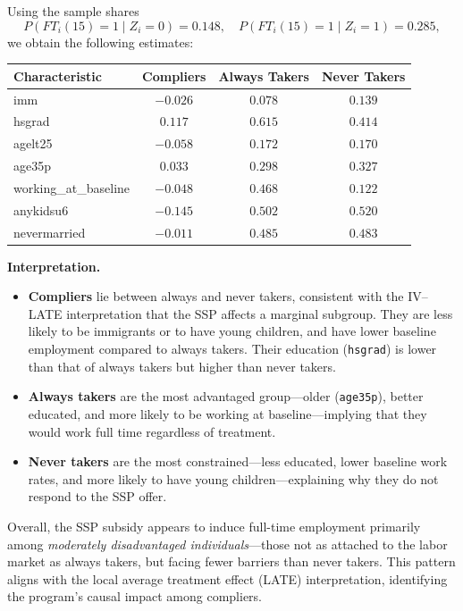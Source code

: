 \documentclass[12pt]{article}
\begin{document}
\begin{enumerate}[label=\arabic*.]
    Using the sample shares
    \[
    P(FT_i(15)=1\mid Z_i=0)=0.148, \quad 
    P(FT_i(15)=1\mid Z_i=1)=0.285,
    \]
    we obtain the following estimates:

    \begin{center}
    \begin{tabular}{@{}lccc@{}}
    \toprule
    Characteristic & Compliers & Always Takers & Never Takers \\
    \midrule
    imm & $-0.026$ & $0.078$ & $0.139$ \\
    hsgrad & $0.117$ & $0.615$ & $0.414$ \\
    agelt25 & $-0.058$ & $0.172$ & $0.170$ \\
    age35p & $0.033$ & $0.298$ & $0.327$ \\
    working\_at\_baseline & $-0.048$ & $0.468$ & $0.122$ \\
    anykidsu6 & $-0.145$ & $0.502$ & $0.520$ \\
    nevermarried & $-0.011$ & $0.485$ & $0.483$ \\
    \bottomrule
    \end{tabular}
    \end{center}

    \noindent\textbf{Interpretation.}
    \begin{itemize}[leftmargin=1.5em]
        \item \textbf{Compliers} lie between always and never takers, consistent with the IV--LATE interpretation that the SSP affects a marginal subgroup. They are less likely to be immigrants or to have young children, and have lower baseline employment compared to always takers. Their education (\texttt{hsgrad}) is lower than that of always takers but higher than never takers.
        \item \textbf{Always takers} are the most advantaged group—older (\texttt{age35p}), better educated, and more likely to be working at baseline—implying that they would work full time regardless of treatment.
        \item \textbf{Never takers} are the most constrained—less educated, lower baseline work rates, and more likely to have young children—explaining why they do not respond to the SSP offer.
    \end{itemize}

    \noindent Overall, the SSP subsidy appears to induce full-time employment primarily among \emph{moderately disadvantaged individuals}—those not as attached to the labor market as always takers, but facing fewer barriers than never takers. This pattern aligns with the local average treatment effect (LATE) interpretation, identifying the program’s causal impact among compliers.

\end{enumerate}
\end{document}

